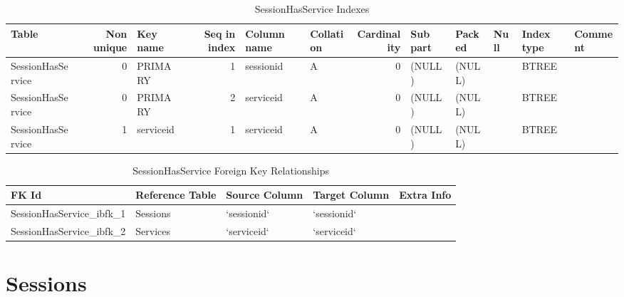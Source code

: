 \documentclass[captions=tablesignature]{scrartcl}
\begin{document}
\begin{table}[htb]
\caption{\label{tbl:sessionhasserviceindexes}SessionHasService Indexes}
\centering
\begin{tabular}{lrlrllrlllll}
\hline
Table & Non unique & Key name & Seq in index & Column name & Collation & Cardinality & Sub part & Packed & Null & Index type & Comment\\
\hline
SessionHasService & 0 & PRIMARY & 1 & sessionid & A & 0 & (NULL) & (NULL) &  & BTREE & \\
SessionHasService & 0 & PRIMARY & 2 & serviceid & A & 0 & (NULL) & (NULL) &  & BTREE & \\
SessionHasService & 1 & serviceid & 1 & serviceid & A & 0 & (NULL) & (NULL) &  & BTREE & \\
\hline
\end{tabular}
\end{table}

\begin{table}[htb]
\caption{\label{tbl:sessonhasservicefkr}SessionHasService Foreign Key Relationships}
\centering
\begin{tabular}{lllll}
\hline
FK Id & Reference Table & Source Column & Target Column & Extra Info\\
\hline
SessionHasService\_ibfk\_1 & Sessions & `sessionid` & `sessionid` & \\
SessionHasService\_ibfk\_2 & Services & `serviceid` & `serviceid` & \\
\hline
\end{tabular}
\end{table}
\section{Sessions}
\label{sec-29}
\end{document}
